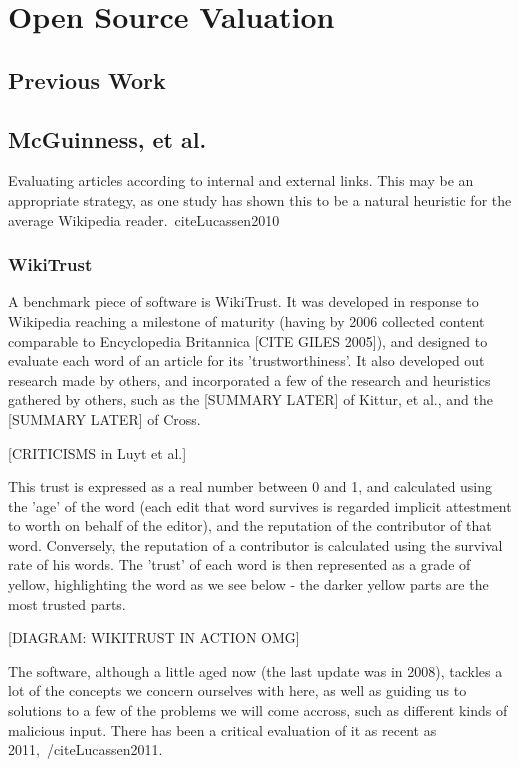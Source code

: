 \documentclass[a4paper,11pt,twoside,notitlepage]{report}
\begin{document}
        \section{Open Source Valuation}
        \subsection{Previous Work}

        \subsection{McGuinness, et al.}
        Evaluating articles according to internal and external
        links. This may be an appropriate strategy, as one study has
        shown this to be a natural heuristic for the average Wikipedia
        reader.~cite{Lucassen2010}

        \subsubsection{WikiTrust}
        A benchmark piece of software is WikiTrust. It was developed
        in response to Wikipedia reaching a milestone of maturity
        (having by 2006 collected content comparable to Encyclopedia
        Britannica [CITE GILES 2005]), and designed to evaluate each
        word of an article for its 'trustworthiness'. It also
        developed out research made by others, and incorporated a few of
        the research and heuristics gathered by others, such as the
        [SUMMARY LATER] of Kittur, et al., and the [SUMMARY LATER] of
        Cross. 

        [CRITICISMS in Luyt et al.]

        This trust is expressed as a real number between 0 and 1, and
        calculated using the 'age' of the word (each edit that word
        survives is regarded implicit attestment to worth on behalf of
        the editor), and the reputation of the contributor of that
        word. Conversely, the reputation of a contributor is
        calculated using the survival rate of his words. The 'trust'
        of each word is then represented as a grade of yellow,
        highlighting the word as we see below - the darker yellow
        parts are the most trusted parts.

        [DIAGRAM: WIKITRUST IN ACTION OMG]

        The software, although a little aged now (the last update was
        in 2008), tackles a lot of the concepts we concern ourselves
        with here, as well as guiding us to solutions to a few of the
        problems we will come accross, such as different kinds of
        malicious input. There has been a critical evaluation of it as
        recent as 2011,~/cite{Lucassen2011}. 
\end{document}

